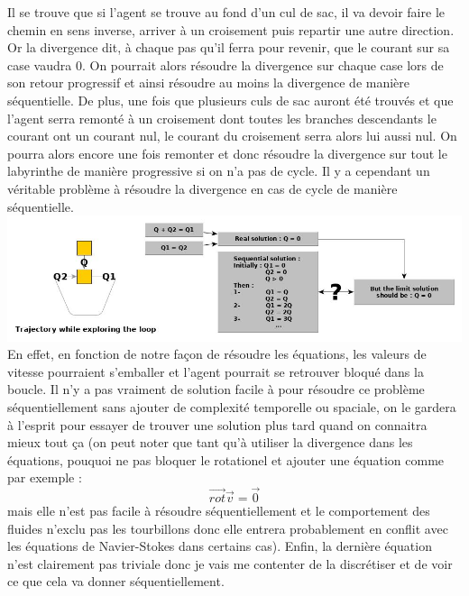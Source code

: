 \documentclass[12pt]{article}
\begin{document}
Il se trouve que si l'agent se trouve au fond d'un cul de sac, il va devoir faire le chemin en sens inverse, arriver à un croisement puis repartir une autre direction. Or la divergence dit, à chaque pas qu'il ferra pour revenir, que le courant sur sa case vaudra 0. On pourrait alors résoudre la divergence sur chaque case lors de son retour progressif et ainsi résoudre au moins la divergence de manière séquentielle. De plus, une fois que plusieurs culs de sac auront été trouvés et que l'agent serra remonté à un croisement dont toutes les branches descendants le courant ont un courant nul, le courant du croisement serra alors lui aussi nul. On pourra alors encore une fois remonter et donc résoudre la divergence sur tout le labyrinthe de manière progressive si on n'a pas de cycle. Il y a cependant un véritable problème à résoudre la divergence en cas de cycle de manière séquentielle.  
\includegraphics[scale=0.45]{ex_div_diverge.jpg}\\
En effet, en fonction de notre façon de résoudre les équations, les valeurs de vitesse pourraient s'emballer et l'agent pourrait se retrouver bloqué dans la boucle. Il n'y a pas vraiment de solution facile à pour résoudre ce problème séquentiellement sans ajouter de complexité temporelle ou spaciale, on le gardera à l'esprit pour essayer de trouver une solution plus tard quand on connaitra mieux tout ça (on peut noter que tant qu'à utiliser la divergence dans les équations, pouquoi ne pas bloquer le rotationel et ajouter une équation comme par exemple : 
\[\overrightarrow{rot} \overrightarrow{v} = \overrightarrow{0}\] mais elle n'est pas facile à résoudre séquentiellement et le comportement des fluides n'exclu pas les tourbillons donc elle entrera probablement en conflit avec les équations de Navier-Stokes dans certains cas).
Enfin, la dernière équation n'est clairement pas triviale donc je vais me contenter de la discrétiser et de voir ce que cela va donner séquentiellement.
\end{document}
